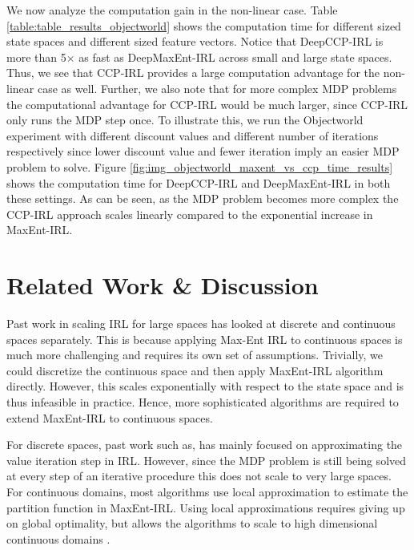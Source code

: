 \documentclass{article}
\begin{document}

We now analyze the computation gain in the non-linear case. Table \ref{table:table_results_objectworld} shows the computation time for different sized state spaces and different sized feature vectors. Notice that DeepCCP-IRL is more than 5$\times$ as fast as DeepMaxEnt-IRL across small and large state spaces. Thus, we see that CCP-IRL provides a large computation advantage for the non-linear case as well. Further, we also note that for more complex MDP problems the computational advantage for CCP-IRL would be much larger, since CCP-IRL only runs the MDP step once. To illustrate this, we run the Objectworld experiment with different discount values and different number of iterations respectively since lower discount value and fewer iteration imply an easier MDP problem to solve. Figure \ref{fig:img_objectworld_maxent_vs_ccp_time_results} shows the computation time for DeepCCP-IRL and DeepMaxEnt-IRL in both these settings. As can be seen, as the MDP problem becomes more complex the CCP-IRL approach scales linearly compared to the exponential increase in MaxEnt-IRL.




\section{Related Work \& Discussion}

Past work in scaling IRL for large spaces has looked at discrete and continuous spaces separately. This is because applying Max-Ent IRL to continuous spaces is much more challenging and requires its own set of assumptions. Trivially, we could discretize the continuous space and then apply MaxEnt-IRL algorithm directly. However, this scales exponentially with respect to the state space and is thus infeasible in practice. 
Hence, more sophisticated algorithms are required to extend MaxEnt-IRL to continuous spaces. 

For discrete spaces, past work such as, \cite{huang2015approximate} has mainly focused on approximating the value iteration step in IRL. However, since the MDP problem is still being solved at every step of an iterative procedure this does not scale to very large spaces. For continuous domains, most algorithms use local approximation to estimate the partition function in MaxEnt-IRL. Using local approximations requires giving up on global optimality, but allows the algorithms to scale to high dimensional continuous domains \cite{levine2012continuous, kalakrishnan2013learning, finn2016guided}.
\end{document}
